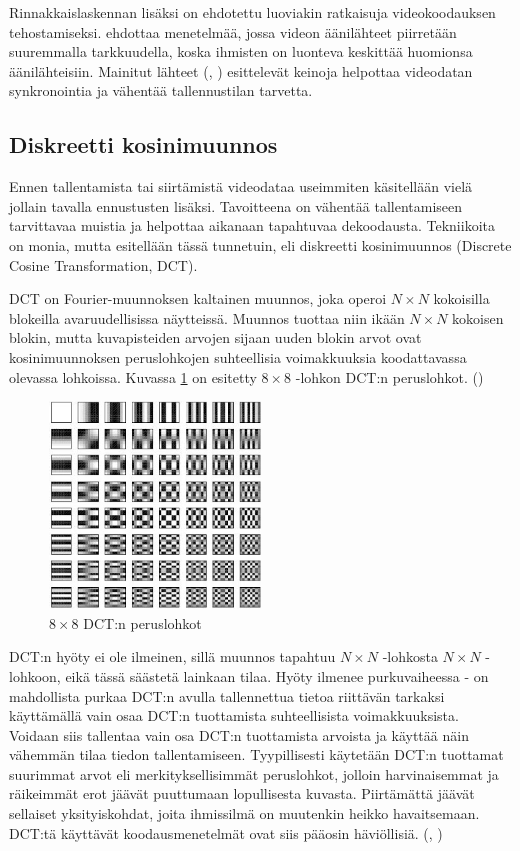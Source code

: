 Rinnakkaislaskennan lisäksi on ehdotettu luoviakin ratkaisuja videokoodauksen
tehostamiseksi. \citealt{lee} ehdottaa menetelmää, jossa videon
äänilähteet piirretään suuremmalla tarkkuudella, koska ihmisten on luonteva
keskittää huomionsa äänilähteisiin. Mainitut lähteet (\citealt{mujal},
\citealt{sync}) esittelevät keinoja helpottaa videodatan synkronointia ja vähentää
tallennustilan tarvetta.

\subsection{Diskreetti kosinimuunnos}

Ennen tallentamista tai siirtämistä videodataa useimmiten käsitellään vielä
jollain tavalla ennustusten lisäksi. Tavoitteena on vähentää tallentamiseen
tarvittavaa muistia ja helpottaa aikanaan tapahtuvaa dekoodausta. Tekniikoita
on monia, mutta esitellään tässä tunnetuin, eli diskreetti kosinimuunnos
(Discrete Cosine Transformation, DCT). 

DCT on Fourier-muunnoksen kaltainen muunnos, joka operoi $N \times N$
kokoisilla blokeilla avaruudellisissa näytteissä. Muunnos tuottaa niin
ikään $N \times N$ kokoisen blokin, mutta kuvapisteiden arvojen sijaan
uuden blokin arvot ovat kosinimuunnoksen peruslohkojen suhteellisia
voimakkuuksia koodattavassa olevassa lohkoissa. Kuvassa \ref{fig:dct} on esitetty
$8  \times 8$ -lohkon DCT:n peruslohkot. (\citealt{h264})

\begin{figure}[ht]
	\centering
	\includegraphics[width=0.5\textwidth]{dct.jpg}
	\caption{$8 \times 8$ DCT:n peruslohkot}
	\label{fig:dct}
\end{figure}

DCT:n hyöty ei ole ilmeinen, sillä muunnos tapahtuu $N \times N$ -lohkosta
$N \times N$ -lohkoon, eikä tässä säästetä lainkaan  tilaa. Hyöty ilmenee
purkuvaiheessa - on mahdollista purkaa DCT:n avulla tallennettua tietoa
riittävän tarkaksi käyttämällä vain osaa DCT:n tuottamista suhteellisista
voimakkuuksista. Voidaan siis tallentaa vain osa DCT:n tuottamista arvoista
ja käyttää näin vähemmän tilaa tiedon tallentamiseen. Tyypillisesti käytetään
DCT:n tuottamat suurimmat arvot eli merkityksellisimmät peruslohkot, jolloin
harvinaisemmat ja räikeimmät erot jäävät puuttumaan lopullisesta kuvasta.
Piirtämättä jäävät sellaiset yksityiskohdat, joita ihmissilmä on muutenkin
heikko havaitsemaan. DCT:tä käyttävät koodausmenetelmät ovat siis pääosin
häviöllisiä. (\citealt{h264}, \citealt{du})

